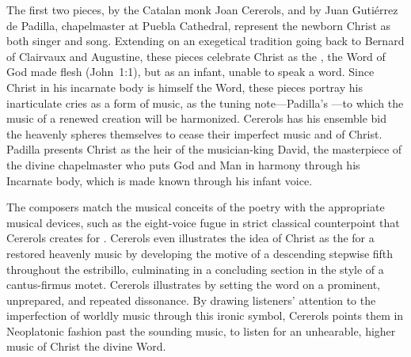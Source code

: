 The first two pieces,  by the 
Catalan monk Joan Cererols, and  by Juan 
Gutiérrez de Padilla, chapelmaster at Puebla Cathedral, represent the newborn 
Christ as both singer and song. 
Extending on an exegetical tradition going back to Bernard of Clairvaux and 
Augustine, these pieces celebrate Christ as the , the Word 
of God made flesh (John~1:1), but as an infant, unable to speak a word. 
Since Christ in his incarnate body is himself the Word, these pieces portray 
his inarticulate cries as a form of music, as the tuning note---Padilla's 
---to which the music of a renewed 
creation will be harmonized.
Cererols has his ensemble bid the heavenly spheres themselves to cease their 
imperfect music and  of Christ.
Padilla presents Christ as the heir of the musician-king David, the masterpiece 
of the divine chapelmaster who puts God and Man in harmony through his 
Incarnate body, which is made known through his infant voice.

The composers match the musical conceits of the poetry with the appropriate 
musical devices, such as the eight-voice fugue in strict classical counterpoint 
that Cererols creates for .
Cererols even illustrates the idea of Christ as the  for a 
restored heavenly music by developing the motive of a descending stepwise fifth 
throughout the estribillo, culminating in a concluding section in the style of 
a cantus-firmus motet.
Cererols illustrates  by setting the word 
 on a prominent, unprepared, and repeated dissonance.
By drawing listeners' attention to the imperfection of worldly music through 
this ironic symbol, Cererols points them in Neoplatonic fashion past the 
sounding music, to listen for an unhearable, higher music of Christ the divine 
Word.

